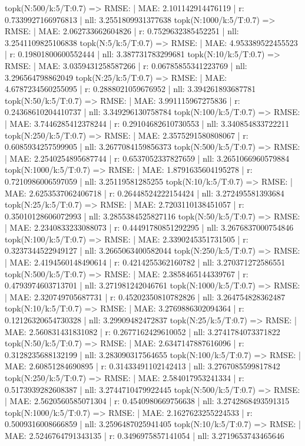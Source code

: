 topk(N:500/k:5/T:0.7) => RMSE: | MAE: 2.101142914476119 | r: 0.7339927166976813 | nll: 3.2551809931377638
topk(N:1000/k:5/T:0.7) => RMSE: | MAE: 2.062733662604826 | r: 0.7529632385452251 | nll: 3.2541109825106838
topk(N:5/k:5/T:0.7) => RMSE: | MAE: 4.953389522455523 | r: 0.19801800600552444 | nll: 3.387731783299681
topk(N:10/k:5/T:0.7) => RMSE: | MAE: 3.0359431258587266 | r: 0.06785855341223769 | nll: 3.296564798862049
topk(N:25/k:5/T:0.7) => RMSE: | MAE: 4.6787234560255095 | r: 0.2888021059676952 | nll: 3.394261893687781
topk(N:50/k:5/T:0.7) => RMSE: | MAE: 3.991115967275836 | r: 0.24368610204410737 | nll: 3.349296130758784
topk(N:100/k:5/T:0.7) => RMSE: | MAE: 3.7446285412378244 | r: 0.29104682610730553 | nll: 3.340854833722211
topk(N:250/k:5/T:0.7) => RMSE: | MAE: 2.3575291580808067 | r: 0.6085934257599905 | nll: 3.2677084159856373
topk(N:500/k:5/T:0.7) => RMSE: | MAE: 2.2540254895687744 | r: 0.6537052337827659 | nll: 3.2651066960579884
topk(N:1000/k:5/T:0.7) => RMSE: | MAE: 1.8791635604195278 | r: 0.7210986006597059 | nll: 3.25119581285255
topk(N:10/k:5/T:0.7) => RMSE: | MAE: 2.6253537062406718 | r: 0.26448524222154424 | nll: 3.272495581393684
topk(N:25/k:5/T:0.7) => RMSE: | MAE: 2.7203110138451057 | r: 0.35010128606072993 | nll: 3.2855384525827116
topk(N:50/k:5/T:0.7) => RMSE: | MAE: 2.2340833233088073 | r: 0.44491780851292295 | nll: 3.2676837000754846
topk(N:100/k:5/T:0.7) => RMSE: | MAE: 2.3390245351731505 | r: 0.3237344522949127 | nll: 3.2665063400582044
topk(N:250/k:5/T:0.7) => RMSE: | MAE: 2.4194560148490614 | r: 0.4214255362160782 | nll: 3.270371272586551
topk(N:500/k:5/T:0.7) => RMSE: | MAE: 2.3858465144339767 | r: 0.4793974603713701 | nll: 3.271981242046761
topk(N:1000/k:5/T:0.7) => RMSE: | MAE: 2.320749705687731 | r: 0.45202350810782826 | nll: 3.264754828362487
topk(N:10/k:5/T:0.7) => RMSE: | MAE: 3.2769886302094364 | r: 0.12126320654730328 | nll: 3.29909482472837
topk(N:25/k:5/T:0.7) => RMSE: | MAE: 2.560831431831082 | r: 0.2677162429610052 | nll: 3.2741784073371822
topk(N:50/k:5/T:0.7) => RMSE: | MAE: 2.6347147887616096 | r: 0.3128235688132199 | nll: 3.283090317564655
topk(N:100/k:5/T:0.7) => RMSE: | MAE: 2.60851284690895 | r: 0.31433491102142413 | nll: 3.2767085599817842
topk(N:250/k:5/T:0.7) => RMSE: | MAE: 2.584017953241334 | r: 0.5173939282608387 | nll: 3.2744710479922445
topk(N:500/k:5/T:0.7) => RMSE: | MAE: 2.5620560585071304 | r: 0.4540980669756638 | nll: 3.2742868493591315
topk(N:1000/k:5/T:0.7) => RMSE: | MAE: 2.1627623255224533 | r: 0.5009316008666859 | nll: 3.2596487025941405
topk(N:10/k:5/T:0.7) => RMSE: | MAE: 2.5246764791343135 | r: 0.3496975857141054 | nll: 3.2719653743465646
